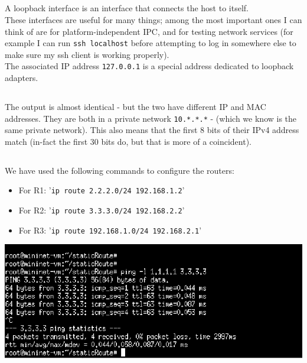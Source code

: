 \subsection{}
A loopback interface is an interface that connects the host to itself.\\
These interfaces are useful for many things; among the most important ones I can think of
are for platform-independent IPC, and for testing network services (for example I can run \texttt{ssh localhost}
before attempting to log in somewhere else to make sure my ssh client is working properly).\\
The associated IP address \texttt{127.0.0.1} is a special address dedicated to loopback adapters.
\subsection{}
The output is almost identical - but the two have different IP and MAC addresses.
They are both in a private network \texttt{10.*.*.*} - (which we know is the same private network).
This also means that the first 8 bits of their IPv4 address match (in-fact the first 30 bits do,
but that is more of a coincident).

\subsection{}
We have used the following commands to configure the routers:
\begin{itemize}
    \item For R1: '\texttt{ip route 2.2.2.0/24 192.168.1.2}'
    \item For R2: '\texttt{ip route 3.3.3.0/24 192.168.2.2}'
    \item For R3: '\texttt{ip route 192.168.1.0/24 192.168.2.1}'
\end{itemize}
\begin{center}
    \includegraphics[width=1.2 \textwidth]{resources/mn1.png}\centering
\end{center}

